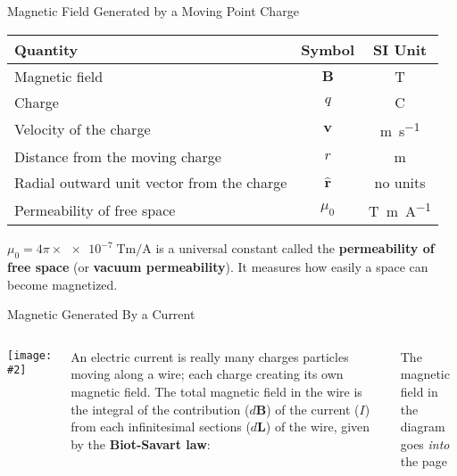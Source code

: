 \documentclass[12pt,aspectratio=169]{beamer}
\newcommand{\pic}[2]{\texttt{[image: \#2]}}
\newcommand{\eq}[2]{\vspace{#1}{\Large\begin{displaymath}#2\end{displaymath}}}
\begin{document}
\begin{frame}{Magnetic Field Generated by a Moving Point Charge}

  \eq{-.1in}{
    \boxed{\bm{B}=\frac{\mu_0}{4\pi}\frac{q\bm{v}\times\hat{\bm{r}}}{r^2}}
  }
  \begin{center}
    \begin{tabular}{l|c|c}
      \rowcolor{pink}
      \textbf{Quantity} & \textbf{Symbol} & \textbf{SI Unit} \\ \hline
      Magnetic field                  & $\bm{B}$ & \si{\tesla}\\
      Charge                          & $q$      & \si{\coulomb}\\
      Velocity of the charge          & $\bm{v}$ & \si{\metre\per\second}\\
      Distance from the moving charge & $r$      & \si{\metre}\\
      Radial outward unit vector from the charge & $\hat{\bm{r}}$ & no units\\
      Permeability of free space & $\mu_0$ & \si{\tesla\metre\per\ampere}
    \end{tabular}
  \end{center}
  $\mu_0=4\pi\times\num{e-7}\;\si{\tesla\metre\per\ampere}$ is a universal
  constant called the \textbf{permeability of free space} (or
  \textbf{vacuum permeability}). It measures how easily a space can become
  magnetized.
\end{frame}



\begin{frame}{Magnetic Generated By a Current}
  \begin{columns}
    \pic{1}{bsav}
    
    An electric current is really many charges particles moving along a wire;
    each charge creating its own magnetic field.
    The total magnetic field in the wire is the integral of the contribution
    ($d\bm{B}$) of the current ($I$) from each infinitesimal sections
    ($d\bm{L}$) of the wire, given by the \textbf{Biot-Savart law}:
  
    \eq{-.2in}{
      \boxed{
        \dl\bm{B}=\frac{\mu_0}{4\pi}\frac{I\dl\bm{L}\times\hat{\bm{r}}}{r^2}
      }
    }

    The magnetic field in the diagram goes \emph{into} the page
  \end{columns}
\end{frame}
\end{document}
